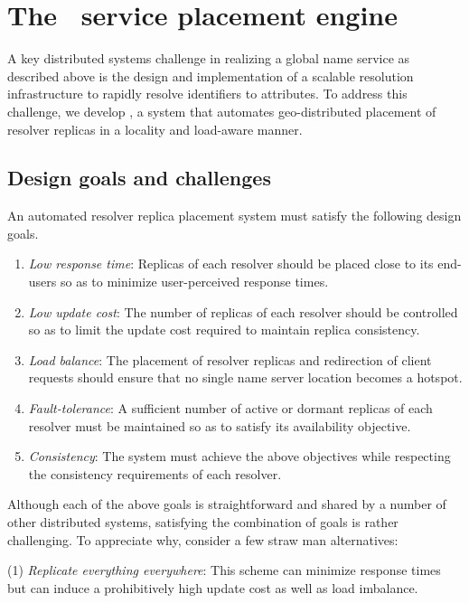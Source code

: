 \section{The \auspice\ service placement engine}

A key distributed systems challenge in realizing a global name service as described above is the design and implementation of a scalable resolution infrastructure to rapidly resolve identifiers to attributes. To address this challenge, we develop \auspice, a system that automates geo-distributed placement of resolver replicas in a locality and load-aware manner.

\subsection{Design goals and challenges}
\label{sec:design_goals}

An automated resolver replica placement system must satisfy the following design goals.

\begin{enumerate}

\item {\em Low response time}: Replicas of each resolver should be placed close to its end-users so as to minimize user-perceived response times.%
\item {\em Low update cost}: The number of replicas of each resolver should be controlled so as to limit the update cost required to maintain replica consistency. 
\item {\em Load balance}: The placement of resolver replicas and redirection of client requests should ensure that no single name server location becomes a hotspot.%
\item {\em Fault-tolerance}: A sufficient number of active or dormant replicas of each resolver must be maintained so as to satisfy its availability objective.
\item {\em Consistency}: The system must achieve the above objectives while respecting the consistency requirements of each resolver.

\end{enumerate}

Although each of the above goals is straightforward and shared by a number of other distributed systems, satisfying the combination of goals is rather challenging. To appreciate why, consider a few straw man alternatives: 

(1) {\em Replicate everything everywhere}: This scheme can minimize response times but can induce a prohibitively high update cost as well as load imbalance. 

